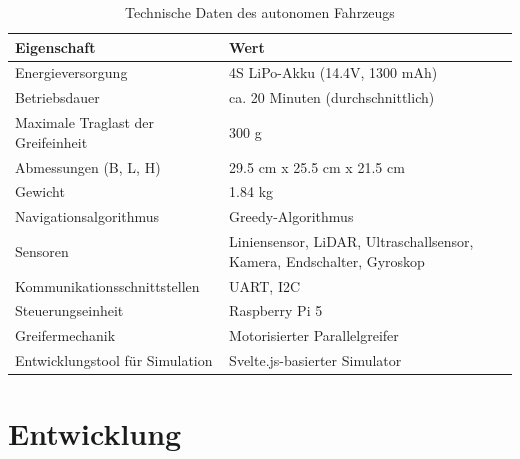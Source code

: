 \documentclass[main.tex]{subfiles} %
\begin{document}
\begin{table}[H]
    \centering
    \renewcommand{\arraystretch}{1.5}
    \begin{tabular}{|l|p{7cm}|}
        \hline
        \textbf{Eigenschaft}               & \textbf{Wert}                                                             \\ \hline
        Energieversorgung                  & 4S LiPo-Akku (14.4V, 1300 mAh)                                            \\ \hline
        Betriebsdauer                      & ca. 20 Minuten (durchschnittlich)                                         \\ \hline
        Maximale Traglast der Greifeinheit & 300 g                                                                     \\ \hline %
        Abmessungen (B, L, H)              & 29.5 cm x 25.5 cm x 21.5 cm                                                     \\ \hline
        Gewicht                            & 1.84 kg                                                                      \\ \hline
        Navigationsalgorithmus             & Greedy-Algorithmus                                                    \\ \hline
        Sensoren                           & Liniensensor, LiDAR, Ultraschallsensor, Kamera, Endschalter, Gyroskop \\ \hline
        Kommunikationsschnittstellen       & UART, I2C                                                                 \\ \hline
        Steuerungseinheit                  & Raspberry Pi 5                                                            \\ \hline %
        Greifermechanik                    & Motorisierter Parallelgreifer                                             \\ \hline
        Entwicklungstool für Simulation    & Svelte.js-basierter Simulator                                             \\ \hline
    \end{tabular}
    \caption{Technische Daten des autonomen Fahrzeugs}
    \label{tab:hardfacts}
\end{table}


\newpage
\section{Entwicklung}


\newpage


\newpage


\newpage
\end{document}
